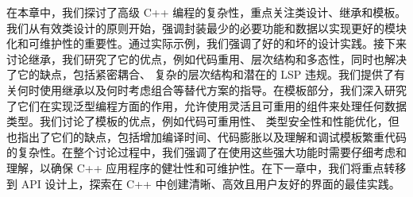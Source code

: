 在本章中，我们探讨了高级 C++ 编程的复杂性，重点关注类设计、继承和模板。我们从有效类设计的原则开始，强调封装最少的必要功能和数据以实现更好的模块化和可维护性的重要性。通过实际示例，我们强调了好的和坏的设计实践。接下来讨论继承，我们研究了它的优点，例如代码重用、层次结构和多态性，同时也解决了它的缺点，包括紧密耦合、 复杂的层次结构和潜在的 LSP 违规。我们提供了有关何时使用继承以及何时考虑组合等替代方案的指导。在模板部分，我们深入研究了它们在实现泛型编程方面的作用，允许使用灵活且可重用的组件来处理任何数据类型。我们讨论了模板的优点，例如代码可重用性、 类型安全性和性能优化，但也指出了它们的缺点，包括增加编译时间、代码膨胀以及理解和调试模板繁重代码的复杂性。在整个讨论过程中，我们强调了在使用这些强大功能时需要仔细考虑和理解，以确保 C++ 应用程序的健壮性和可维护性。在下一章中，我们将重点转移到 API 设计上，探索在 C++ 中创建清晰、高效且用户友好的界面的最佳实践。